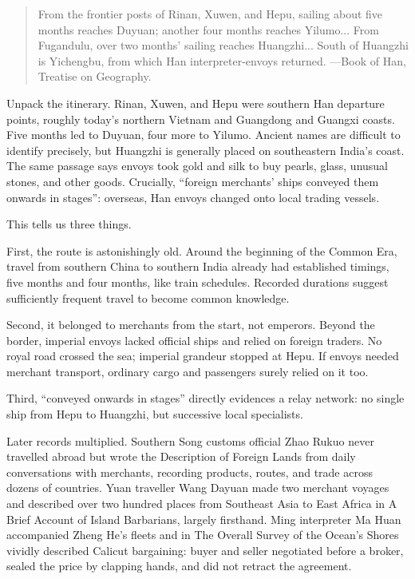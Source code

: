 \begin{quote}
From the frontier posts of Rinan, Xuwen, and Hepu, sailing about five months reaches Duyuan; another four months reaches Yilumo... From Fugandulu, over two months' sailing reaches Huangzhi... South of Huangzhi is Yichengbu, from which Han interpreter-envoys returned. ---Book of Han, Treatise on Geography.
\end{quote}
Unpack the itinerary. Rinan, Xuwen, and Hepu were southern Han departure points, roughly today's northern Vietnam and Guangdong and Guangxi coasts. Five months led to Duyuan, four more to Yilumo. Ancient names are difficult to identify precisely, but Huangzhi is generally placed on southeastern India's coast. The same passage says envoys took gold and silk to buy pearls, glass, unusual stones, and other goods. Crucially, ``foreign merchants' ships conveyed them onwards in stages'': overseas, Han envoys changed onto local trading vessels.

This tells us three things.

First, the route is astonishingly old. Around the beginning of the Common Era, travel from southern China to southern India already had established timings, five months and four months, like train schedules. Recorded durations suggest sufficiently frequent travel to become common knowledge.

Second, it belonged to merchants from the start, not emperors. Beyond the border, imperial envoys lacked official ships and relied on foreign traders. No royal road crossed the sea; imperial grandeur stopped at Hepu. If envoys needed merchant transport, ordinary cargo and passengers surely relied on it too.

Third, ``conveyed onwards in stages'' directly evidences a relay network: no single ship from Hepu to Huangzhi, but successive local specialists.

Later records multiplied. Southern Song customs official Zhao Rukuo never travelled abroad but wrote the Description of Foreign Lands from daily conversations with merchants, recording products, routes, and trade across dozens of countries. Yuan traveller Wang Dayuan made two merchant voyages and described over two hundred places from Southeast Asia to East Africa in A Brief Account of Island Barbarians, largely firsthand. Ming interpreter Ma Huan accompanied Zheng He's fleets and in The Overall Survey of the Ocean's Shores vividly described Calicut bargaining: buyer and seller negotiated before a broker, sealed the price by clapping hands, and did not retract the agreement.

